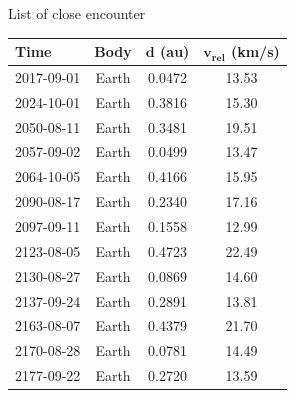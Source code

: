 \documentclass[final]{beamer}
\newlength{\onecolwid}
\begin{document}
\begin{frame}[t]
\begin{columns}[t]
\begin{column}{\onecolwid}
\begin{alertblock}{List of close encounter}
\begin{table}
\vspace{2ex}
\begin{tabular}{l c c c}
\toprule
\textbf{Time} & \textbf{   Body   } & \textbf{  $\boldsymbol{d}$ (au)  } & \textbf{$\boldsymbol{v_{rel}}$ (km/s)} \\
\midrule2017-09-01 & Earth & 0.0472 & 13.53 \\ 
2024-10-01 & Earth & 0.3816 & 15.30 \\ 
2050-08-11 & Earth & 0.3481 & 19.51 \\ 
2057-09-02 & Earth & 0.0499 & 13.47 \\ 
2064-10-05 & Earth & 0.4166 & 15.95 \\ 
2090-08-17 & Earth & 0.2340 & 17.16 \\ 
2097-09-11 & Earth & 0.1558 & 12.99 \\ 
2123-08-05 & Earth & 0.4723 & 22.49 \\ 
2130-08-27 & Earth & 0.0869 & 14.60 \\ 
2137-09-24 & Earth & 0.2891 & 13.81 \\ 
2163-08-07 & Earth & 0.4379 & 21.70 \\ 
2170-08-28 & Earth & 0.0781 & 14.49 \\ 
2177-09-22 & Earth & 0.2720 & 13.59 \\ 
\bottomrule
\end{tabular}
\end{table}
\end{alertblock}

\end{column} 


\end{columns} 
\end{frame}
\end{document}

